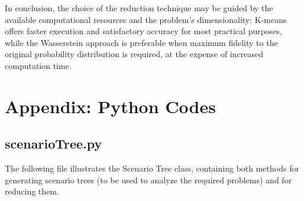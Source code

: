 \documentclass[a4paper,12pt]{article}
\begin{document}
	\noindent In conclusion, the choice of the reduction technique may be guided by the available computational resources and the problem's dimensionality: K-means offers faster execution and satisfactory accuracy for most practical purposes, while the Wasserstein approach is preferable when maximum fidelity to the original probability distribution is required, at the expense of increased computation time.
	

\appendix
\section{Appendix: Python Codes}	



\subsection{scenarioTree.py}
\noindent The following file illustrates the Scenario Tree class, containing both methods for generating scenario trees (to be used to analyze the required problems) and for reducing them.
\end{document}
